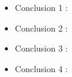 \documentclass[preprint,12pt]{elsarticle}
\begin{document}
\begin{multicols}{2}
\begin{itemize}

\item Conclusion 1 : \\

\item Conclusion 2 : \\ 

\item Conclusion 3 : \\ 

\item Conclusion 4 : \\ 
\end{itemize}

\end{multicols}

	
	\newpage
	
		 
\end{document}
